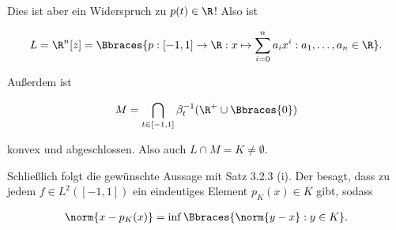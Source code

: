 \begin{solution}
Dies ist aber ein Widerspruch zu $p(t) \in \R$!
Also ist

\begin{align*}
  L =
  \R^n[z] =
  \Bbraces
  {
    p: [-1, 1] \to \R:
    x \mapsto \sum_{i = 0}^n a_ix^i:
    a_1, \ldots, a_n \in \R
  }.
\end{align*}

Außerdem ist

\begin{align*}
  M =
  \bigcap_{t \in [-1, 1]} \beta_t^{-1}(\R^+ \cup \Bbraces{0})
\end{align*}

konvex und abgeschlossen.
Also auch $L \cap M = K \neq \emptyset$.


Schließlich folgt die gewünschte Aussage mit Satz 3.2.3 (i).
Der besagt, dass zu jedem $f \in L^2([-1, 1])$ ein eindeutiges Element $p_K(x) \in K$ gibt, sodass

\begin{align*}
  \norm{x - p_K(x)}
  =
  \inf \Bbraces{\norm{y - x}: y \in K}.
\end{align*}

\end{solution}
